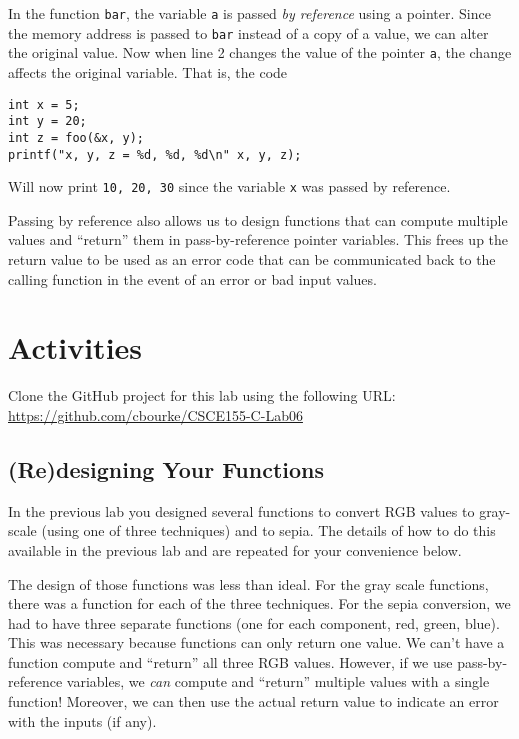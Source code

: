 \documentclass[12pt]{scrartcl}
\begin{document}
In the function \texttt{bar}, the variable \texttt{a} is passed
\emph{by reference} using a pointer.  Since the memory address is passed
to \texttt{bar} instead of a copy of a value, we can alter the original
value.  Now when line 2 changes the value of the pointer \texttt{a}, 
the change affects the original variable.  That is, the code 

\begin{verbatim}
int x = 5;
int y = 20;
int z = foo(&x, y);
printf("x, y, z = %d, %d, %d\n" x, y, z);
\end{verbatim}

Will now print \texttt{10, 20, 30} since the variable \texttt{x}
was passed by reference.

Passing by reference also allows us to design functions that can
compute multiple values and ``return'' them in pass-by-reference
pointer variables.  This frees up the return value to be used as 
an error code that can be communicated back to the calling function
in the event of an error or bad input values.

\section{Activities}

Clone the GitHub project for this lab using the following URL:
\url{https://github.com/cbourke/CSCE155-C-Lab06}

\subsection{(Re)designing Your Functions}

In the previous lab you designed several functions to convert RGB
values to gray-scale (using one of three techniques) and to sepia.
The details of how to do this available in the previous lab and 
are repeated for your convenience below.  

The design of those functions was less than ideal.  For the
gray scale functions, there was a function for each of the three 
techniques.  For the sepia conversion, we had to have three separate
functions (one for each component, red, green, blue).  This was 
necessary because functions can only return one value.  We can't have
a function compute and ``return'' all three RGB values.  However,
if we use pass-by-reference variables, we \emph{can} compute and
``return'' multiple values with a single function!  Moreover, we
can then use the actual return value to indicate an error with the inputs
(if any).  
\end{document}
